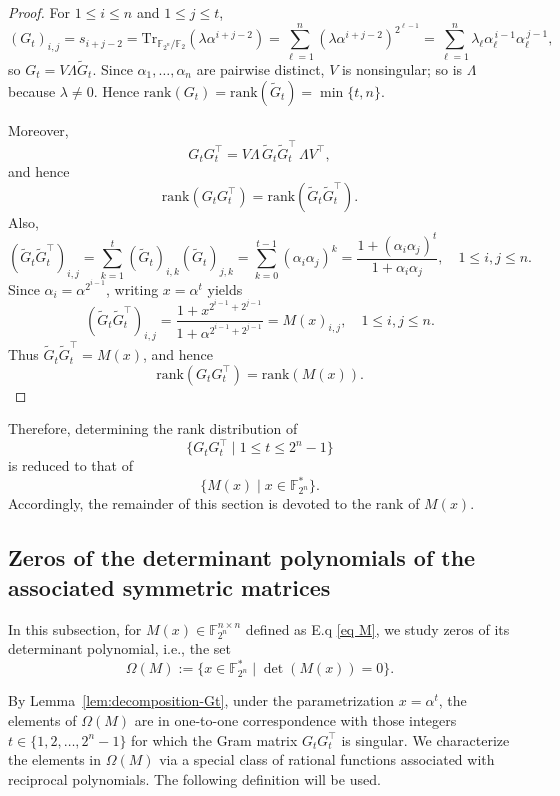 \documentclass[hidelinks,onefignum,onetabnum]{siamart251216}
\theoremstyle{definition}
\theoremstyle{remark}
\providecommand{\rank}{{\mathrm{rank}}}
\providecommand{\Tr}{{\mathrm{Tr}}}
\begin{document}
\begin{proof}
	For $1\le i\le n$ and $1\le j\le t$,
	\[
	(G_t)_{i,j}
	=s_{i+j-2}
	=\Tr_{\mathbb F_{2^n}/\mathbb F_2}(\lambda\alpha^{i+j-2})
	=\sum_{\ell=1}^n(\lambda\alpha^{i+j-2})^{2^{\ell-1}}
	=\sum_{\ell=1}^n \lambda_\ell \alpha_\ell^{\,i-1}\alpha_\ell^{\,j-1},
	\]
	so $G_t=V\Lambda\widetilde G_t$. Since $\alpha_1,\dots,\alpha_n$ are pairwise distinct, $V$ is
	nonsingular; so is $\Lambda$ because $\lambda\ne 0$. Hence
	$\rank(G_t)=\rank(\widetilde G_t)=\min\{t,n\}$.
	
Moreover,
\[
G_tG_t^\top
=
V\Lambda\,\widetilde G_t\widetilde G_t^\top\,\Lambda V^\top,
\]
and hence
\[
\rank(G_tG_t^\top)=\rank(\widetilde G_t\widetilde G_t^\top).
\]
Also,
\[
(\widetilde G_t\widetilde G_t^\top)_{i,j}
=
\sum_{k=1}^t(\widetilde G_t)_{i,k}(\widetilde G_t)_{j,k}
=
\sum_{k=0}^{t-1}(\alpha_i\alpha_j)^k
=
\frac{1+(\alpha_i\alpha_j)^t}{1+\alpha_i\alpha_j},
\quad 1\le i,j\le n.
\]
Since $\alpha_i=\alpha^{2^{i-1}}$, writing $x=\alpha^t$ yields
\[
(\widetilde G_t\widetilde G_t^\top)_{i,j}
=
\frac{1+x^{2^{i-1}+2^{j-1}}}{1+\alpha^{2^{i-1}+2^{j-1}}}
=
M(x)_{i,j},
\quad 1\le i,j\le n.
\]
Thus $\widetilde G_t\widetilde G_t^\top=M(x)$, and hence
\[
\rank(G_tG_t^\top)=\rank(M(x)).
\]
\end{proof}

 Therefore, determining the rank distribution of
 \[
 \{G_tG_t^\top\mid 1\le t\le 2^n-1\}
 \]
 is reduced to that of
 \[
 \{M(x)\mid x\in\mathbb F_{2^n}^*\}.
 \]
 Accordingly, the remainder of this section is devoted to the rank of $M(x)$.

 


\subsection{Zeros of the determinant polynomials of the associated symmetric matrices}

In this subsection, for $M(x)\in\mathbb F_{2^n}^{n\times n}$ defined as E.q \eqref{eq M}, we study zeros of its determinant polynomial, i.e., the set $$\Omega (M):=\{ x\in\mathbb F_{2^n}^*\mid  \det (M(x))=0\}.$$

By Lemma~\ref{lem:decomposition-Gt}, under the parametrization $x=\alpha^t$, the elements of
$\Omega(M)$ are in one-to-one correspondence with those integers $t\in\{1,2,\dots,2^n-1\}$ for
which the Gram matrix $G_tG_t^\top$ is singular. We characterize the elements in $\Omega (M)$ via a special class of rational functions associated with reciprocal polynomials. The following definition will be used.
\end{document}
